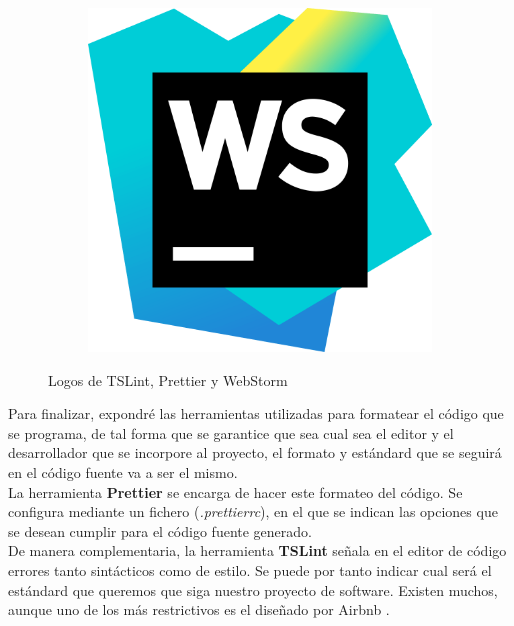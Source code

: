 \begin{figure}[ht]
\begin{subfigure}[b]{0.12\textwidth}
    \end{subfigure}
    \quad
    \begin{subfigure}[b]{0.12\textwidth}
       \includegraphics[width=\textwidth]{mem/images/cap-4/4.1.2(desarrollo)/webstorm-logo.png}
    \end{subfigure}
    \caption{Logos de TSLint, Prettier y WebStorm}\label{fig:animals}
\end{figure}
 
 Para finalizar, expondré las herramientas utilizadas para formatear el código que se programa, de tal forma que se garantice que sea cual sea el editor y el desarrollador que se incorpore al proyecto, el formato y estándard que se seguirá en el código fuente va a ser el mismo. \\
 
 La herramienta \textbf{Prettier} \cite{prettier} se encarga de hacer este formateo del código. Se configura mediante un fichero (\textit{.prettierrc}), en el que se indican las opciones que se desean cumplir para el código fuente generado. \\
 
 De manera complementaria, la herramienta \textbf{TSLint} \cite{tslint} señala en el editor de código errores tanto sintácticos como de estilo. Se puede por tanto indicar cual será el estándard que queremos que siga nuestro proyecto de software. Existen muchos, aunque uno de los más restrictivos es el diseñado por Airbnb \cite{airbnbjs}. \\
 
